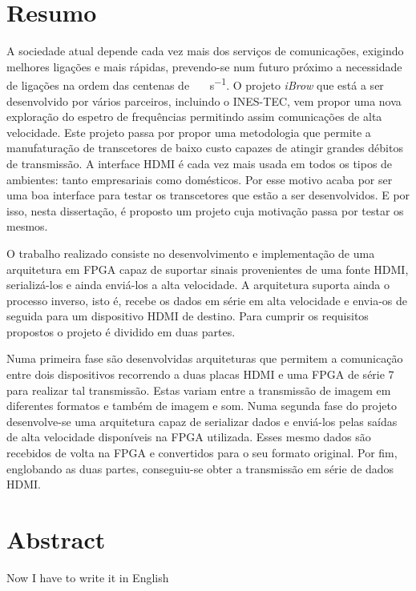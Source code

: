 \chapter*{Resumo}

A sociedade atual depende cada vez mais dos serviços de comunicações, exigindo melhores ligações e mais rápidas, prevendo-se num futuro próximo a necessidade de ligações na ordem das centenas de \SI{}{\giga\bit\per\second}. O projeto \textit{iBrow} que está a ser desenvolvido por vários parceiros, incluindo o INES-TEC, vem propor uma nova exploração do espetro de frequências permitindo assim comunicações de alta velocidade. Este projeto passa por propor uma metodologia que permite a manufaturação de transcetores de baixo custo capazes de atingir grandes débitos de transmissão. A interface HDMI é cada vez mais usada em todos os tipos de ambientes: tanto empresariais como domésticos. Por esse motivo acaba por ser uma boa interface para testar os transcetores que estão a ser desenvolvidos. E por isso, nesta dissertação, é proposto um projeto cuja motivação passa por testar os mesmos. 

O trabalho realizado consiste no desenvolvimento e implementação de  uma arquitetura em FPGA capaz de suportar sinais provenientes de uma fonte HDMI, serializá-los e ainda enviá-los a alta velocidade. A arquitetura suporta ainda o processo inverso, isto é, recebe os dados em série em alta velocidade e envia-os de seguida para um dispositivo HDMI de destino. Para cumprir os requisitos propostos o projeto é dividido em duas partes.

Numa primeira fase são desenvolvidas arquiteturas que permitem a comunicação entre dois dispositivos recorrendo a duas placas HDMI e uma FPGA de série 7 para realizar tal transmissão. Estas variam entre a transmissão de imagem em diferentes formatos e também de imagem e som. Numa segunda fase do projeto desenvolve-se uma arquitetura capaz de serializar dados e enviá-los pelas saídas de alta velocidade disponíveis na FPGA utilizada. Esses mesmo dados são recebidos de volta na FPGA e convertidos para o seu formato original. Por fim, englobando as duas partes, conseguiu-se obter a transmissão em série de dados HDMI.

\chapter*{Abstract}

Now I have to write it in English
